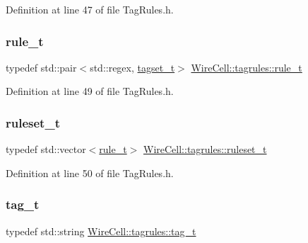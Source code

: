 Definition at line 47 of file Tag\+Rules.\+h.

\mbox{\label{namespace_wire_cell_1_1tagrules_abc013e08147e32e1661654bb3e768151}} 
\subsubsection{\texorpdfstring{rule\+\_\+t}{rule\_t}}
{\footnotesize\ttfamily typedef std\+::pair$<$std\+::regex, \hyperlink{namespace_wire_cell_1_1tagrules_a80263165e3d13e49e317c045829f76cb}{tagset\+\_\+t}$>$ \hyperlink{namespace_wire_cell_1_1tagrules_abc013e08147e32e1661654bb3e768151}{Wire\+Cell\+::tagrules\+::rule\+\_\+t}}



Definition at line 49 of file Tag\+Rules.\+h.

\mbox{\label{namespace_wire_cell_1_1tagrules_a93f5672d7c60d5f990b42dd93fd0aee2}} 
\subsubsection{\texorpdfstring{ruleset\+\_\+t}{ruleset\_t}}
{\footnotesize\ttfamily typedef std\+::vector$<$\hyperlink{namespace_wire_cell_1_1tagrules_abc013e08147e32e1661654bb3e768151}{rule\+\_\+t}$>$ \hyperlink{namespace_wire_cell_1_1tagrules_a93f5672d7c60d5f990b42dd93fd0aee2}{Wire\+Cell\+::tagrules\+::ruleset\+\_\+t}}



Definition at line 50 of file Tag\+Rules.\+h.

\mbox{\label{namespace_wire_cell_1_1tagrules_ae74af6e8edaf0f64b70f6df4e0b66cdc}} 
\subsubsection{\texorpdfstring{tag\+\_\+t}{tag\_t}}
{\footnotesize\ttfamily typedef std\+::string \hyperlink{namespace_wire_cell_1_1tagrules_ae74af6e8edaf0f64b70f6df4e0b66cdc}{Wire\+Cell\+::tagrules\+::tag\+\_\+t}}



